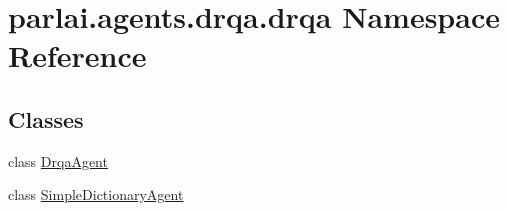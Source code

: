 \hypertarget{namespaceparlai_1_1agents_1_1drqa_1_1drqa}{}\section{parlai.\+agents.\+drqa.\+drqa Namespace Reference}
\label{namespaceparlai_1_1agents_1_1drqa_1_1drqa}
\subsection*{Classes}
\begin{DoxyCompactItemize}
\item 
class \hyperlink{classparlai_1_1agents_1_1drqa_1_1drqa_1_1DrqaAgent}{Drqa\+Agent}
\item 
class \hyperlink{classparlai_1_1agents_1_1drqa_1_1drqa_1_1SimpleDictionaryAgent}{Simple\+Dictionary\+Agent}
\end{DoxyCompactItemize}
